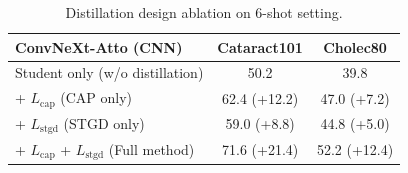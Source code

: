 \begin{table}[t]
\centering
\caption{Distillation design ablation on 6-shot setting.}
\label{tab:distill_strategy}
\small
\setlength{\tabcolsep}{5pt}
\begin{tabular}{l c c}
\toprule
ConvNeXt-Atto (CNN) & Cataract101 & Cholec80 \\
\midrule
Student only (w/o distillation)                & 50.2                   & 39.8                   \\
+ $L_\mathrm{cap}$ (CAP only)                 & 62.4 {\scriptsize (+12.2)} & 47.0 {\scriptsize (+7.2)} \\
+ $L_\mathrm{stgd}$ (STGD only)               & 59.0 {\scriptsize (+8.8)} & 44.8 {\scriptsize (+5.0)} \\
+ $L_\mathrm{cap}$ + $L_\mathrm{stgd}$ (Full method) & 71.6 {\scriptsize (+21.4)} & 52.2 {\scriptsize (+12.4)} \\
\bottomrule
\end{tabular}
\end{table}

